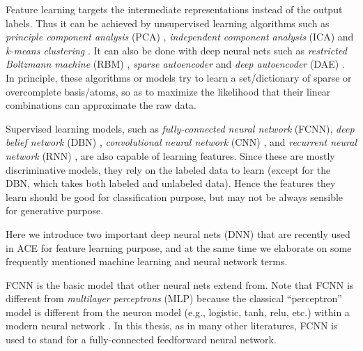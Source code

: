 Feature learning targets the intermediate representations instead of the output labels. Thus it can be achieved by unsupervised learning algorithms such as {\it principle component analysis} (PCA) \cite{jolliffe2002principal}, {\it independent component analysis} (ICA) \cite{hyvarinen2004independent} and {\it k-means clustering} \cite{macqueen1967some}. It can also be done with deep neural nets such as {\it restricted Boltzmann machine} (RBM) \cite{hinton2006fast}, \textit{sparse autoencoder} \cite{ng2011sparse} and {\it deep autoencoder} (DAE) \cite{bengio2009learning}. In principle, these algorithms or models try to learn a set/dictionary of sparse or overcomplete basis/atoms, so as to maximize the likelihood that their linear combinations can approximate the raw data.


Supervised learning models, such as {\it fully-connected neural network} (FCNN), {\it deep belief network} (DBN) \cite{hinton2006fast}, \textit{convolutional neural network} (CNN) \cite{lecun1995convolutional}, and {\it recurrent neural network} (RNN) \cite{elman1990finding}, are also capable of learning features. Since these are mostly discriminative models, they rely on the labeled data to learn (except for the DBN, which takes both labeled and unlabeled data). Hence the features they learn should be good for classification purpose, but may not be always sensible for generative purpose.

Here we introduce two important deep neural nets (DNN) that are recently used in ACE for feature learning purpose, and at the same time we elaborate on some frequently mentioned machine learning and neural network terms.

FCNN is the basic model that other neural nets extend from. Note that FCNN is different from \textit{multilayer perceptrons} (MLP) because the classical ``perceptron'' model \cite{rosenblatt1958perceptron} is different from the neuron model (e.g., logistic, tanh, relu, etc.) within a modern neural network \cite{rumelhart1988parallel}. In this thesis, as in many other literatures, FCNN is used to stand for a fully-connected feedforward neural network.

